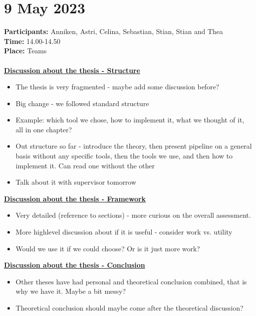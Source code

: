 \section{9 May 2023}
\textbf{Participants:} Anniken, Astri, Celina, Sebastian, Stian, Stian and Thea \\
\textbf{Time:} 14.00-14.50 \\
\textbf{Place:} Teams
\\~\\
\textbf{\underline{Discussion about the thesis - Structure}}
\begin{itemize}
    \item The thesis is very fragmented - maybe add some discussion before?
    \item Big change - we followed standard structure
    \item Example: which tool we chose, how to implement it, what we thought of it, all in one chapter?
    \item Out structure so far - introduce the theory, then present pipeline on a general basis without any specific tools, then the tools we use, and then how to implement it. Can read one without the other
    \item Talk about it with supervisor tomorrow
\end{itemize}

\textbf{\underline{Discussion about the thesis - Framework}}
\begin{itemize}
    \item Very detailed (reference to sections) - more curious on the overall assessment. 
    \item More highlevel discussion about if it is useful - consider work vs. utility
    \item Would we use it if we could choose? Or is it just more work?
\end{itemize}

\textbf{\underline{Discussion about the thesis - Conclusion}}
\begin{itemize}
    \item Other theses have had personal and theoretical conclusion combined, that is why we have it. Maybe a bit messy?
    \item Theoretical conclusion should maybe come after the theoretical discussion? 
\end{itemize}

